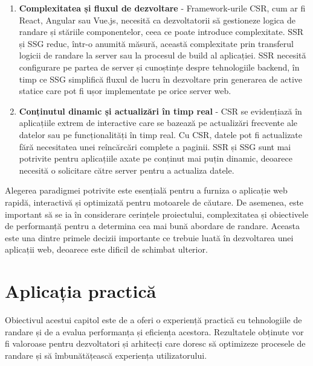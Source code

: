 \documentclass[12pt, a4paper]{report}
\begin{document}
\begin{enumerate}
	\item \textbf{Complexitatea și fluxul de dezvoltare} - Framework-urile CSR, cum ar fi React, Angular sau Vue.js, necesită ca dezvoltatorii să gestioneze logica de randare și stăriile componentelor, ceea ce poate introduce complexitate. SSR și SSG reduc, într-o anumită măsură, această complexitate prin transferul logicii de randare la server sau la procesul de build al aplicației. SSR necesită configurare pe partea de server și cunoștințe despre tehnologiile backend, în timp ce SSG simplifică fluxul de lucru în dezvoltare prin generarea de active statice care pot fi ușor implementate pe orice server web.
	\item \textbf{Conținutul dinamic și actualizări în timp real} - CSR se evidențiază în aplicațiile extrem de interactive care se bazează pe actualizări frecvente ale datelor sau pe funcționalități în timp real. Cu CSR, datele pot fi actualizate fără necesitatea unei re\^inc\u arc\u ari complete a paginii. SSR și SSG sunt mai potrivite pentru aplicațiile axate pe conținut mai puțin dinamic, deoarece necesită o solicitare către server pentru a actualiza datele.
\end{enumerate}

Alegerea paradigmei potrivite este esențială pentru a furniza o aplicație web rapidă, interactivă și optimizat\u a pentru motoarele de c\u autare. De asemenea, este important să se ia în considerare cerințele proiectului, complexitatea și obiectivele de performanță pentru a determina cea mai bună abordare de randare. Aceasta este una dintre primele decizii importante ce trebuie luat\u a în dezvoltarea unei aplicații web, deoarece este dificil de schimbat ulterior.

\chapter{Aplicația practică}

Obiectivul acestui capitol este de a oferi o experiență practică cu tehnologiile de randare și de a evalua performanța și eficiența acestora. Rezultatele obținute vor fi valoroase pentru dezvoltatori și arhitecți care doresc să optimizeze procesele de randare și să îmbunătățească experiența utilizatorului.

\end{document}
